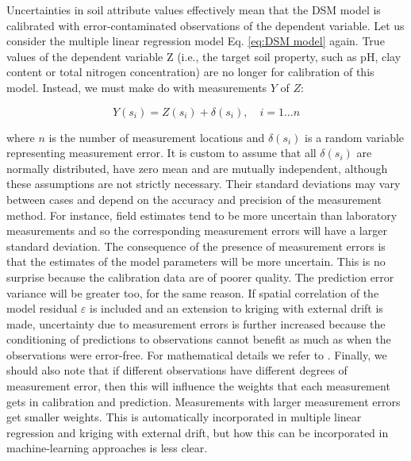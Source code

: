 \documentclass[10pt,b5paper,]{book}
\theoremstyle{definition}
\theoremstyle{definition}
\theoremstyle{definition}
\theoremstyle{remark}
\begin{document}
Uncertainties in soil attribute values effectively mean that the DSM
model is calibrated with error-contaminated observations of the
dependent variable. Let us consider the multiple linear regression model
Eq. \ref{eq:DSM model} again. True values of the dependent variable Z
(i.e., the target soil property, such as pH, clay content or total
nitrogen concentration) are no longer for calibration of this model.
Instead, we must make do with measurements \(Y\) of \(Z\):

\begin{equation}
Y(s_i) = Z(s_i) + \delta(s_i), \quad i = 1 \dots n
\end{equation}

where \(n\) is the number of measurement locations and \({\delta(s_i)}\)
is a random variable representing measurement error. It is custom to
assume that all \({\delta(s_i)}\) are normally distributed, have zero
mean and are mutually independent, although these assumptions are not
strictly necessary. Their standard deviations may vary between cases and
depend on the accuracy and precision of the measurement method. For
instance, field estimates tend to be more uncertain than laboratory
measurements and so the corresponding measurement errors will have a
larger standard deviation. The consequence of the presence of
measurement errors is that the estimates of the model parameters will be
more uncertain. This is no surprise because the calibration data are of
poorer quality. The prediction error variance will be greater too, for
the same reason. If spatial correlation of the model residual
\({\varepsilon}\) is included and an extension to kriging with external
drift is made, uncertainty due to measurement errors is further
increased because the conditioning of predictions to observations cannot
benefit as much as when the observations were error-free. For
mathematical details we refer to \cite{cressie1993statistics}. Finally,
we should also note that if different observations have different
degrees of measurement error, then this will influence the weights that
each measurement gets in calibration and prediction. Measurements with
larger measurement errors get smaller weights. This is automatically
incorporated in multiple linear regression and kriging with external
drift, but how this can be incorporated in machine-learning approaches
is less clear.
\end{document}
